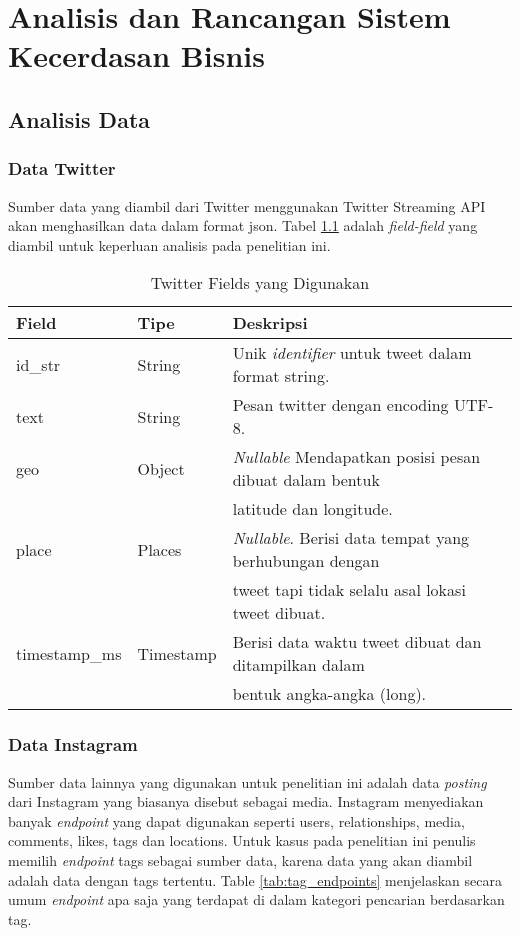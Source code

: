 \chapter{Analisis dan Rancangan Sistem Kecerdasan Bisnis}

\section{Analisis Data}
\subsection{Data Twitter}
Sumber data yang diambil dari Twitter menggunakan Twitter Streaming API akan menghasilkan data dalam format json. Tabel \ref{tab:twitter_fields} adalah \textit{field-field} yang diambil untuk keperluan analisis pada penelitian ini. 

\begin{table}[!htb]
	\centering
	\begin{tabular}{| l | l | l |}
		\hline
		Field & Tipe & Deskripsi \\
	 	\hline
	 	id\_str & String & Unik \textit{identifier} untuk tweet dalam format string. \\
	 	text & String & Pesan twitter dengan encoding UTF-8. \\
	 	geo & Object & \textit{Nullable} Mendapatkan posisi pesan dibuat dalam bentuk\\
	 	& & latitude dan longitude. \\
	 	place & Places & \textit{Nullable}. Berisi data tempat yang berhubungan dengan\\
	 	& & tweet tapi tidak selalu asal lokasi tweet dibuat. \\
	 	timestamp\_ms & Timestamp & Berisi data waktu tweet dibuat dan ditampilkan dalam\\
	 	& & bentuk angka-angka (long).\\
	 	\hline
	\end{tabular}	
	\caption{Twitter Fields yang Digunakan}\label{tab:twitter_fields}
\end{table}	

\subsection{Data Instagram}
Sumber data lainnya yang digunakan untuk penelitian ini adalah data \textit{posting} dari Instagram yang biasanya disebut sebagai media. Instagram menyediakan banyak \textit{endpoint} yang dapat digunakan seperti users, relationships, media, comments, likes, tags dan locations. Untuk kasus pada penelitian ini penulis memilih \textit{endpoint} tags sebagai sumber data, karena data yang akan diambil adalah data dengan tags tertentu. Table \ref{tab:tag_endpoints} menjelaskan secara umum \textit{endpoint} apa saja yang terdapat di dalam kategori pencarian berdasarkan tag.

